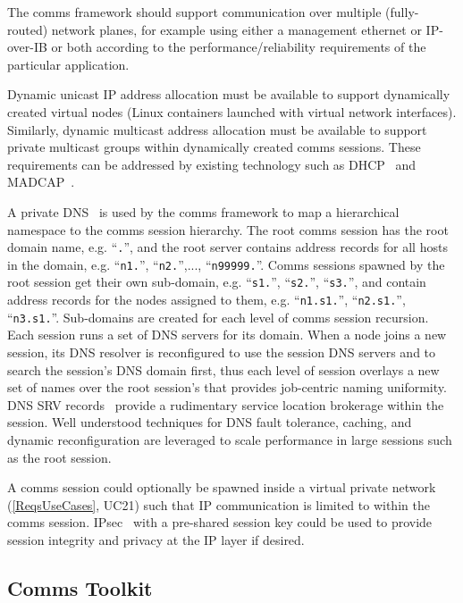 The comms framework should support communication over multiple
(fully-routed) network planes, for example using either a management
ethernet or IP-over-IB or both according to the performance/reliability
requirements of the particular application.

Dynamic unicast IP address allocation must be available to support
dynamically created virtual nodes (Linux containers launched with
virtual network interfaces).  Similarly,
dynamic multicast address allocation must be available to support
private multicast groups within dynamically created comms sessions.
These requirements can be addressed by existing technology such as
DHCP~\cite{rfc2131} and MADCAP~\cite{rfc2730}.

A private DNS~\cite{rfc1034} is used by the comms framework to
map a hierarchical namespace to the comms session hierarchy.
The root comms session has the root domain name, e.g. ``{\tt \ngrm.}'',
and the root server contains address records for all hosts in the domain, e.g.
``{\tt n1.\ngrm}'', ``{\tt n2.\ngrm}'',..., ``{\tt n99999.\ngrm}''.
Comms sessions spawned by the root session get their own sub-domain, e.g.
``{\tt s1.\ngrm}'', ``{\tt s2.\ngrm}'', ``{\tt s3.\ngrm}'',
and contain address records for the nodes assigned to them, e.g.
``{\tt n1.s1.\ngrm}'', ``{\tt n2.s1.\ngrm}'', ``{\tt n3.s1.\ngrm}''.
Sub-domains are created for each level of comms session recursion.
Each session runs a set of DNS servers for its domain.
When a node joins a new session, its DNS resolver is reconfigured to use
the session DNS servers and to search the session's DNS domain first,
thus each level of session overlays a new set of names over
the root session's that provides job-centric naming uniformity.
DNS SRV records~\cite{rfc2782} provide a rudimentary service location
brokerage within the session.
Well understood techniques for DNS fault tolerance,
caching, and dynamic reconfiguration are leveraged to scale performance
in large sessions such as the root session.

A comms session could optionally be spawned inside a virtual private
network (\ref{ReqsUseCases}, UC21) such that IP communication
is limited to within the comms session.  IPsec~\cite{rfc2401} with
a pre-shared session key could be used to provide session integrity and
privacy at the IP layer if desired.

\subsection{Comms Toolkit}


